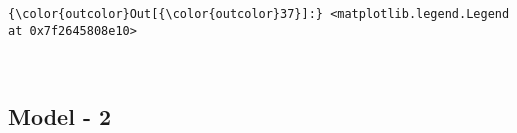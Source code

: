 \documentclass[11pt]{article}
\begin{document}
\begin{Verbatim}[commandchars=\\\{\}]
{\color{outcolor}Out[{\color{outcolor}37}]:} <matplotlib.legend.Legend at 0x7f2645808e10>
\end{Verbatim}
            
    \begin{center}
    \end{center}
    { \hspace*{\fill} \\}
    
    \hypertarget{model---2}{%
\subsection{Model - 2}\label{model---2}}
\end{document}
